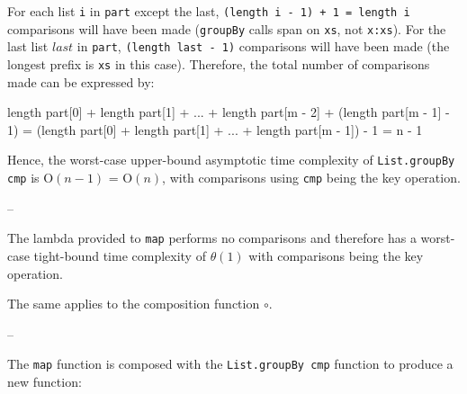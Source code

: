\documentclass[../main.tex]{subfiles}
\begin{document}
For each list \texttt{i} in \texttt{part} except the last, \texttt{(length i - 1) + 1 = length i} comparisons will have been made (\texttt{groupBy} calls span on \texttt{xs}, not \texttt{x:xs}).  For the last list $last$ in \texttt{part}, \texttt{(length last - 1)} comparisons will have been made (the longest prefix is \texttt{xs} in this case).  Therefore, the total number of comparisons made can be expressed by:

\begin{code}
length part[0] + length part[1] + ... + length part[m - 2] + (length part[m - 1] - 1)
= (length part[0] + length part[1] + ... + length part[m - 1]) - 1
= n - 1
\end{code}

Hence, the worst-case upper-bound asymptotic time complexity of \texttt{List.groupBy cmp} is O$(n - 1)$ = O$(n)$, with comparisons using \texttt{cmp} being the key operation.
\qedsymbol

--

The lambda provided to \texttt{map} performs no comparisons and therefore has a worst-case tight-bound time complexity of
$\theta(1)$ with comparisons being the key operation.

The same applies to the composition function $\circ$.

--








The \texttt{map} function is composed with the \texttt{List.groupBy cmp} function to produce a new function:
\end{document}
